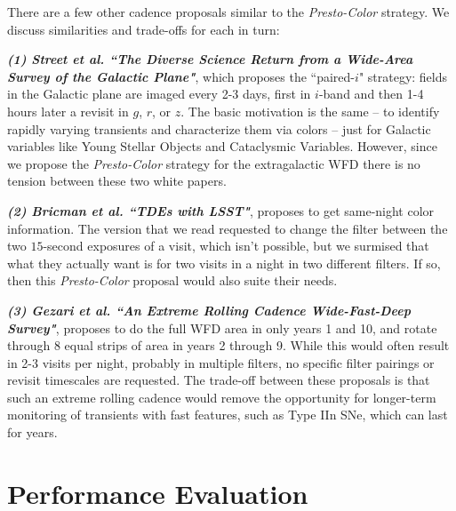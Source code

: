 \documentclass[12pt, letterpaper]{article}
\begin{document}
\begin{enumerate}
    There are a few other cadence proposals similar to the {\em Presto-Color} strategy. We discuss similarities and trade-offs for each in turn:  
    
    {\bf \emph{(1) Street et al. ``The Diverse Science Return from a Wide-Area Survey of the Galactic Plane"}}, which proposes the ``paired-$i$" strategy: fields in the Galactic plane are imaged every 2-3 days, first in $i$-band and then 1-4 hours later a revisit in $g$, $r$, or $z$. The basic motivation is the same -- to identify rapidly varying transients and characterize them via colors -- just for Galactic variables like Young Stellar Objects and Cataclysmic Variables. However, since we propose the {\em Presto-Color} strategy for the extragalactic WFD there is no tension between these two white papers. 
    
    {\bf \emph{(2) Bricman et al. ``TDEs with LSST"}}, proposes to get same-night color information. The version that we read requested to change the filter between the two $15$-second exposures of a visit, which isn't possible, but we surmised that what they actually want is for two visits in a night in two different filters. If so, then this {\em Presto-Color} proposal would also suite their needs. 
    
    {\bf \emph{(3) Gezari et al. ``An Extreme Rolling Cadence Wide-Fast-Deep Survey"}}, proposes to do the full WFD area in only years 1 and 10, and rotate through 8 equal strips of area in years 2 through 9. While this would often result in 2-3 visits per night, probably in multiple filters, no specific filter pairings or revisit timescales are requested. The trade-off between these proposals is that such an extreme rolling cadence would remove the opportunity for longer-term monitoring of transients with fast features, such as Type IIn SNe, which can last for years.  
\end{enumerate}


\clearpage
\section{Performance Evaluation}
\end{document}
